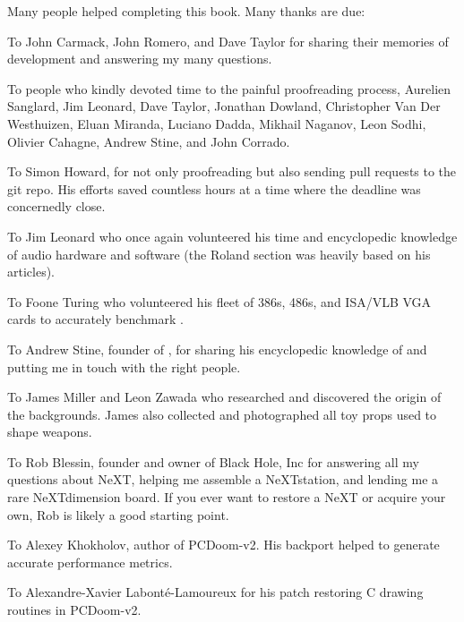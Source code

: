 Many people helped completing this book. Many thanks are due:\\
\par
To John Carmack, John Romero, and Dave Taylor for sharing their memories of \doom{} development and answering my many questions.\\
\par
To people who kindly devoted time to the painful proofreading process, Aurelien Sanglard, Jim Leonard, Dave Taylor, Jonathan Dowland, Christopher Van Der Westhuizen, Eluan Miranda, Luciano Dadda, Mikhail Naganov, Leon Sodhi, Olivier Cahagne, Andrew Stine, and John Corrado.\\
\par
To Simon Howard, for not only proofreading but also sending pull requests to the git repo. His efforts saved countless hours at a time where the deadline was
concernedly close.\\
\par
To Jim Leonard who once again volunteered his time and encyclopedic knowledge of audio hardware and software (the Roland section was heavily based on his articles).\\
\par
To Foone Turing who volunteered his fleet of 386s, 486s, and ISA/VLB VGA cards to accurately benchmark \doom{}.\\
\par
To Andrew Stine, founder of , for sharing his encyclopedic knowledge of \doom{} and putting me in touch with the right people.\\
\par
To James Miller and Leon Zawada who researched and discovered the origin of the backgrounds. James also collected and photographed all toy props used to shape \doom{} weapons.\\
\par
To Rob Blessin, founder and owner of Black Hole, Inc for answering all my questions about NeXT, helping me assemble a NeXTstation, and lending me a rare NeXTdimension board. If you ever want to restore a NeXT or acquire your own, Rob is likely a good starting point.\\
\par
To Alexey Khokholov, author of PCDoom-v2. His backport helped to generate accurate performance metrics.\\
\par
To Alexandre-Xavier Labont\'e-Lamoureux for his patch restoring C drawing routines in PCDoom-v2.\\
